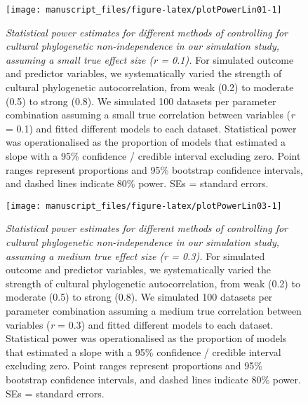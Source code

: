 \documentclass[
  man,floatsintext]{apa6}
\begin{document}
\begin{figure}[H]
\texttt{[image: manuscript\_files/figure-latex/plotPowerLin01-1]} \caption{\emph{Statistical power estimates for different methods of controlling for cultural phylogenetic non-independence in our simulation study, assuming a small true effect size (r = 0.1).} For simulated outcome and predictor variables, we systematically varied the strength of cultural phylogenetic autocorrelation, from weak (0.2) to moderate (0.5) to strong (0.8). We simulated 100 datasets per parameter combination assuming a small true correlation between variables (\emph{r} = 0.1) and fitted different models to each dataset. Statistical power was operationalised as the proportion of models that estimated a slope with a 95\% confidence / credible interval excluding zero. Point ranges represent proportions and 95\% bootstrap confidence intervals, and dashed lines indicate 80\% power. SEs = standard errors.}\label{fig:plotPowerLin01}
\end{figure}

\newpage



\begin{figure}[H]
\texttt{[image: manuscript\_files/figure-latex/plotPowerLin03-1]} \caption{\emph{Statistical power estimates for different methods of controlling for cultural phylogenetic non-independence in our simulation study, assuming a medium true effect size (r = 0.3).} For simulated outcome and predictor variables, we systematically varied the strength of cultural phylogenetic autocorrelation, from weak (0.2) to moderate (0.5) to strong (0.8). We simulated 100 datasets per parameter combination assuming a medium true correlation between variables (\emph{r} = 0.3) and fitted different models to each dataset. Statistical power was operationalised as the proportion of models that estimated a slope with a 95\% confidence / credible interval excluding zero. Point ranges represent proportions and 95\% bootstrap confidence intervals, and dashed lines indicate 80\% power. SEs = standard errors.}\label{fig:plotPowerLin03}
\end{figure}

\newpage
\end{document}
